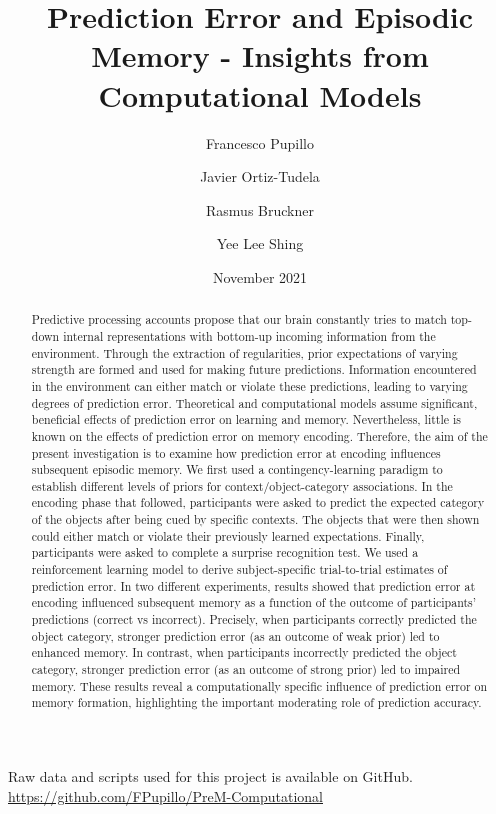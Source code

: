 \documentclass[a4paper,12pt]{article} 			%
\title{Prediction Error and Episodic Memory - Insights from Computational Models}
\author[1]{Francesco Pupillo}
\author[1]{Javier Ortiz-Tudela}
\author[2]{Rasmus Bruckner}
\author[1]{Yee Lee Shing}
\affil[1]{Goethe-Universität Frankfurt}
\affil[2]{Freie Universität Berlin}
\date{November 2021}
\begin{document}
{
\hypersetup{linkcolor=black}
\tableofcontents
}
\setlength{\parindent}{10ex}

\maketitle

\noindent
Raw data and scripts used for this project is available on GitHub. \url{https://github.com/FPupillo/PreM-Computational} 


\begin{abstract}
\noindent
Predictive processing accounts propose that our brain constantly tries to match top-down internal representations with bottom-up incoming information from the environment. Through the extraction of regularities, prior expectations of varying strength are formed and used for making future predictions. Information encountered in the environment can either match or violate these predictions, leading to varying degrees of prediction error. Theoretical and computational models assume significant, beneficial effects of prediction error on learning and memory. Nevertheless, little is known on the effects of prediction error on memory encoding. Therefore, the aim of the present investigation is to examine how prediction error at encoding influences subsequent episodic memory. We first used a contingency-learning paradigm to establish different levels of priors for context/object-category associations. In the encoding phase that followed, participants were asked to predict the expected category of the objects after being cued by specific contexts. The objects that were then shown could either match or violate their previously learned expectations. Finally, participants were asked to complete a surprise recognition test. We used a reinforcement learning model to derive subject-specific trial-to-trial estimates of prediction error. In two different experiments, results showed that prediction error at encoding influenced subsequent memory as a function of the outcome of participants’ predictions (correct vs incorrect). Precisely, when participants correctly predicted the object category, stronger prediction error (as an outcome of weak prior) led to enhanced memory. In contrast, when participants incorrectly predicted the object category, stronger prediction error (as an outcome of strong prior) led to impaired memory. These results reveal a computationally specific influence of prediction error on memory formation, highlighting the important moderating role of prediction accuracy.     
\end{abstract}
\end{document}
